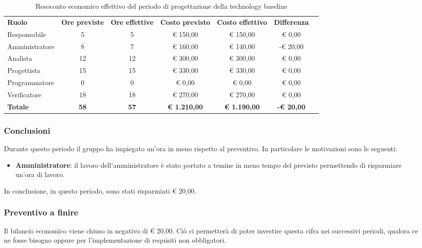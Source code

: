 \documentclass[../piano-di-progetto.tex]{subfiles}
\begin{document}
  \begin{table}[H]
    \centering
    \begin{tabular}{lcccccc}
      \rowcolor{lightgray}
      \textbf{Ruolo}  & \textbf{Ore previste} & \textbf{Ore effettive} & \textbf{Costo previsto} & \textbf{Costo effettivo} & \textbf{Differenza} \\
Responsabile    & 5           & 5           & € 150,00            & € 150,00            & € 0,00            \\
Amministratore  & 8           & 7           & € 160,00            & € 140,00            & -€ 20,00          \\
Analista        & 12          & 12          & € 300,00            & € 300,00            & € 0,00            \\
Progettista     & 15          & 15          & € 330,00            & € 330,00            & € 0,00            \\
Programmatore   & 0           & 0           & € 0,00              & € 0,00              & € 0,00            \\
Verificatore    & 18          & 18          & € 270,00            & € 270,00            & € 0,00            \\
\textbf{Totale} & \textbf{58} & \textbf{57} & \textbf{€ 1.210,00} & \textbf{€ 1.190,00} & \textbf{-€ 20,00}

    \end{tabular}
    \caption{Resoconto economico effettivo del periodo di progettazione della technology baseline}
  \end{table}


\subsubsection{Conclusioni}
Durante questo periodo il gruppo ha impiegato un'ora in meno rispetto al preventivo. In particolare le motivazioni sono le seguenti:
\begin{itemize}
    \item \textbf{Amministratore}: il lavoro dell'amministratore è stato portato a temine in meno tempo del previsto permettendo di risparmiare un'ora di lavoro.
\end{itemize}
In conclusione, in questo periodo, sono stati risparmiati € 20,00.

\subsubsection{Preventivo a finire}
Il bilancio economico viene chiuso in negativo di € 20,00. Ciò ci permetterà di poter investire questa cifra nei successivi periodi, qualora ce ne fosse bisogno oppure per l'implementazione di requisiti non obbligatori.
\end{document}

